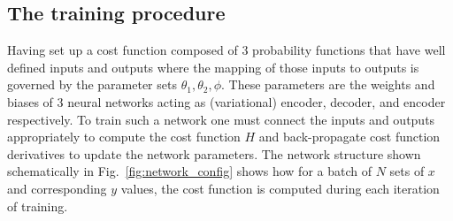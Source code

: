 \documentclass[%
showpacs,
 amsmath,amssymb,
 aps,
 twocolumn,
 prl,
 reprint,
floatfix,
]{revtex4-1}
\begin{document}
\subsection{The training procedure}
%
%
Having set up a cost function composed of 3 probability functions that have
well defined inputs and outputs where the mapping of those inputs to outputs is
governed by the parameter sets $\theta_{1},\theta_{2},\phi$. These parameters
are the weights and biases of 3 neural networks acting as (variational)
encoder, decoder, and encoder respectively. To train such a network one must
connect the inputs and outputs appropriately to compute the cost function $H$
and back-propagate cost function derivatives to update the network parameters.
The network structure shown schematically in Fig.~\ref{fig:network_config}
shows how for a batch of $N$ sets of $x$ and corresponding $y$ values, the cost
function is computed during each iteration of training. 
\end{document}
